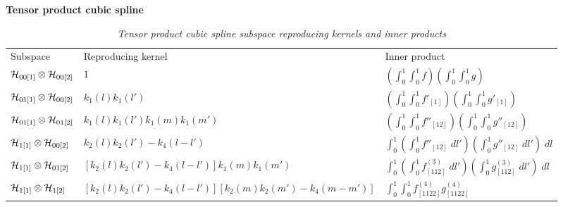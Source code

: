 \begin{example}{\textbf {Tensor product cubic spline}}
\begin{landscape}
\begin{table}[H]
\caption{\textit{Tensor product cubic spline subspace reproducing kernels and inner products}} %
\centering %
\begin{tabular}{lll} %
\hline \\
\hline %
Subspace 	& 		Reproducing kernel 		& 	Inner product \\
\hline %
$\mathcal{H}_{00\left[1\right]} \otimes \mathcal{H}_{00\left[2\right]}$ & 	$1$								     & 	$\left( \int_0^1 \int_0^1 f \right) \left( \int_0^1 \int_0^1 g \right)$ \\ [1ex] 
$\mathcal{H}_{01\left[1\right]} \otimes \mathcal{H}_{00\left[2\right]} $& 	$k_1\left(l\right)k_1\left(l'\right)$						     & 	$\left( \int_0^1 \int_0^1 f'_{\left[1\right]} \right) \left( \int_0^1 \int_0^1 g'_{\left[1\right]} \right)$ \\ [1ex] 
$\mathcal{H}_{01\left[1\right]} \otimes \mathcal{H}_{01\left[2\right]}$ & 	$k_1\left(l\right)k_1\left(l'\right)k_1\left(m\right)k_1\left(m'\right)$ & $\left( \int_0^1 \int_0^1 f''_{\left[12\right]} \right) \left( \int_0^1 \int_0^1 g''_{\left[12\right]} \right)$ \\ [1ex] 
$\mathcal{H}_{1\left[1\right]} \otimes \mathcal{H}_{00\left[2\right]}$  	& 	$k_2\left(l\right)k_2\left(l'\right) - k_4\left(l - l'\right)$	      & $\int_0^1 \left( \int_0^1 f''_{\left[12\right]}\;dl' \right) \left(  \int_0^1 g''_{\left[12\right]} \;dl'\right)\;dl $\\ [1ex] 
$\mathcal{H}_{1\left[1\right]} \otimes \mathcal{H}_{01\left[2\right]}$ 	& 	$\left[k_2\left(l\right)k_2\left(l'\right) - k_4\left(l - l'\right)\right]k_1\left(m\right)k_1\left(m'\right)$ & $\int_0^1 \left( \int_0^1 f^{\left(3\right)}_{\left[112\right]}\;dl' \right) \left(  \int_0^1 g^{\left(3\right)}_{\left[112\right]} \;dl'\right)\;dl$ \\ [1ex]  
$\mathcal{H}_{1\left[1\right]} \otimes \mathcal{H}_{1\left[2\right]}$  		& $\left[k_2\left(l\right)k_2\left(l'\right) - k_4\left(l - l'\right)\right]\left[k_2\left(m\right)k_2\left(m'\right) - k_4\left(m - m'\right)\right]$ & $\int_0^1  \int_0^1 f^{\left(4\right)}_{\left[1122\right]}g^{\left(4\right)}_{\left[1122\right]}$ \\ [1ex]  
\hline %
\end{tabular}
\label{table:tensor-product-cubic-spline-RK-table}
\end{table}
\end{landscape}
\end{example}

